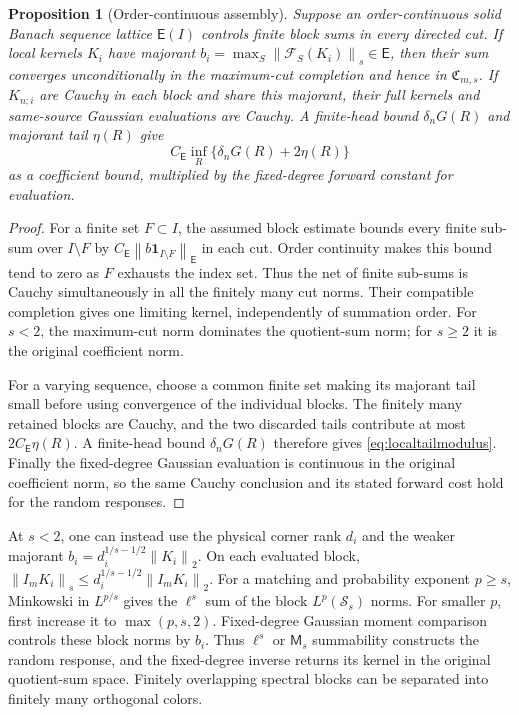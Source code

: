\documentclass[11pt,a4paper]{amsart}
\numberwithin{equation}{section}
\newtheorem{proposition}[theorem]{Proposition}
\theoremstyle{definition}
\theoremstyle{remark}
\newcommand{\Sch}{\mathcal S}
\newcommand{\Coeff}{\mathfrak C}
\newcommand{\Flat}{\mathcal F}
\newcommand{\norm}[1]{\left\lVert#1\right\rVert}
\begin{document}
\begin{proposition}[Order-continuous assembly]\label{prop:assembly}
Suppose an order-continuous solid Banach sequence lattice $\mathsf E(I)$ controls finite block sums in every directed cut. If local kernels $K_i$ have majorant
$b_i=\max_S\norm{\Flat_S(K_i)}_s\in\mathsf E$,
then their sum converges unconditionally in the maximum-cut completion and hence in $\Coeff_{m,s}$. If $K_{n;i}$ are Cauchy in each block and share this majorant, their full kernels and same-source Gaussian evaluations are Cauchy. A finite-head bound $\delta_nG(R)$ and majorant tail $\eta(R)$ give
\begin{equation}\label{eq:localtailmodulus}
 C_{\mathsf E}\inf_R\{\delta_nG(R)+2\eta(R)\}
\end{equation}
as a coefficient bound, multiplied by the fixed-degree forward constant for evaluation.
\end{proposition}
\begin{proof}
For a finite set $F\subset I$, the assumed block estimate bounds every finite sub-sum over $I\setminus F$ by $C_{\mathsf E}\norm{b\mathbf1_{I\setminus F}}_{\mathsf E}$ in each cut. Order continuity makes this bound tend to zero as $F$ exhausts the index set. Thus the net of finite sub-sums is Cauchy simultaneously in all the finitely many cut norms. Their compatible completion gives one limiting kernel, independently of summation order. For $s<2$, the maximum-cut norm dominates the quotient-sum norm; for $s\ge2$ it is the original coefficient norm.

For a varying sequence, choose a common finite set making its majorant tail small before using convergence of the individual blocks. The finitely many retained blocks are Cauchy, and the two discarded tails contribute at most $2C_{\mathsf E}\eta(R)$. A finite-head bound $\delta_nG(R)$ therefore gives \eqref{eq:localtailmodulus}. Finally the fixed-degree Gaussian evaluation is continuous in the original coefficient norm, so the same Cauchy conclusion and its stated forward cost hold for the random responses.
\end{proof}

At $s<2$, one can instead use the physical corner rank $d_i$ and the weaker majorant
$b_i=d_i^{1/s-1/2}\norm{K_i}_2$.
On each evaluated block,
$\norm{I_mK_i}_s\le d_i^{1/s-1/2}\norm{I_mK_i}_2$.
For a matching and probability exponent $p\ge s$, Minkowski in $L^{p/s}$ gives the $\ell^s$ sum of the block $L^p(\Sch_s)$ norms. For smaller $p$, first increase it to $\max(p,s,2)$. Fixed-degree Gaussian moment comparison controls these block norms by $b_i$. Thus $\ell^s$ or $\mathsf M_s$ summability constructs the random response, and the fixed-degree inverse returns its kernel in the original quotient-sum space. Finitely overlapping spectral blocks can be separated into finitely many orthogonal colors.
\end{document}
